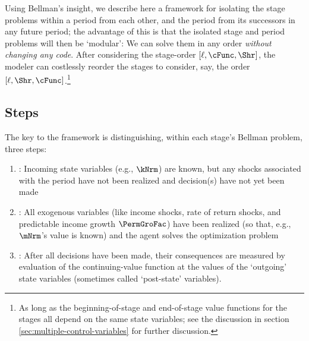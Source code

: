 \documentclass[\econtexRoot/SolvingMicroDSOPs]{subfiles}
\begin{document}
Using Bellman's insight, we describe here a framework for isolating the {stage} problems within a {period} from each other, and the {period} from its successors in any future {period}; the advantage of this is that the isolated {stage} and {period} problems will then be `modular': We can solve them in any order \textit{without changing any code}. After considering the {stage}-order $[\ell,\cFunc,\Shr]$, the modeler can costlessly reorder the {stage}s to consider, say, the order $[\ell,\Shr,\cFunc]$.\footnote{As long as the beginning-of-{stage} and end-of-{stage} value functions for the {stage}s all depend on the same state variables; see the discussion in section \ref{sec:multiple-control-variables} for further discussion.}

\subsection{Steps}

The key to the framework is distinguishing, within each {stage}'s Bellman problem, three {steps}:

\begin{enumerate}
\item \textbf{\Arrival}: Incoming state variables (e.g., $\kNrm$) are known, but any shocks associated with the period have not been realized and decision(s) have not yet been made
\item \textbf{\Decision}: All exogenous variables (like income shocks, rate of return shocks, and predictable income growth $\PermGroFac$) have been realized (so that, e.g., $\mNrm$'s value is known) and the agent solves the optimization problem
\item \textbf{\Continuation}: After all decisions have been made, their consequences are measured by evaluation of the continuing-value function at the values of the `outgoing' state variables (sometimes called `post-state' variables).
\end{enumerate}

\end{document}
